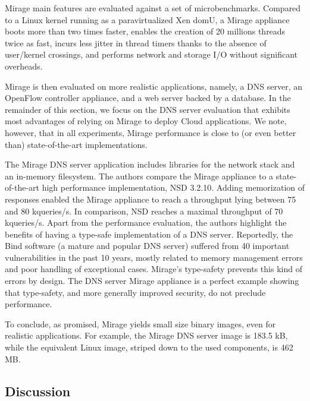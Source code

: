Mirage main features are evaluated against a set of microbenchmarks.
Compared to a Linux kernel running as a paravirtualized Xen domU, a Mirage appliance boots more than two times faster, enables the creation of 20 millions threads twice as fast, incurs less jitter in thread timers thanks to the absence of user/kernel crossings, and performs network and storage I/O without significant overheads.

Mirage is then evaluated on more realistic applications, namely, a DNS server, an OpenFlow controller appliance, and a web server backed by a database.
In the remainder of this section, we focus on the DNS server evaluation that exhibits most advantages of relying on Mirage to deploy Cloud applications.
We note, however, that in all experiments, Mirage performance is close to (or even better than) state-of-the-art implementations.

The Mirage DNS server application includes libraries for the network stack and an in-memory filesystem.
The authors compare the Mirage appliance to a state-of-the-art high performance implementation, NSD 3.2.10.
Adding memorization of responses enabled the Mirage appliance to reach a throughput lying between 75 and 80 kqueries/s.
In comparison, NSD reaches a maximal throughput of 70 kqueries/s.
Apart from the performance evaluation, the authors highlight the benefits of having a type-safe implementation of a DNS server.
Reportedly, the Bind software (a mature and popular DNS server) suffered from 40 important vulnerabilities in the past 10 years, mostly related to memory management errors and poor handling of exceptional cases.
Mirage's type-safety prevents this kind of errors by design.
The DNS server Mirage appliance is a perfect example showing that type-safety, and more generally improved security, do not  preclude performance. 

To conclude, as promised, Mirage yields small size binary images, even for realistic applications.
For example, the Mirage DNS server image is 183.5 kB, while the equivalent Linux image, striped down to the used components, is 462 MB.


\subsection{Discussion}


